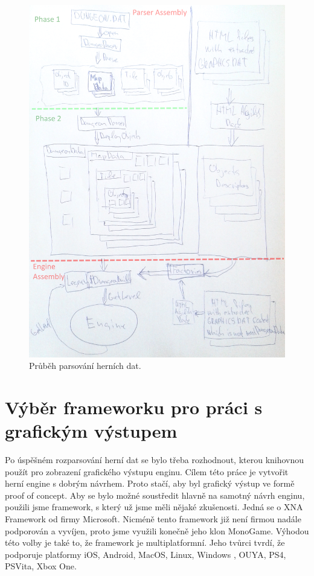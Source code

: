 \begin{figure}[H]\centering
\includegraphics[width=\textwidth]{./img/DM-parser.png}
\caption{Průběh parsování herních dat.}
\label{parser:analyza}
\end{figure}

\section{Výběr frameworku pro práci s grafickým výstupem}

Po úspěšném rozparsování herní dat se bylo třeba rozhodnout, kterou knihovnou použít pro zobrazení grafického výstupu enginu. 
Cílem této práce je vytvořit herní engine s dobrým návrhem. Proto stačí, aby byl grafický výstup ve formě proof of concept. 
Aby se bylo možné soustředit hlavně na samotný návrh enginu, použili jsme framework, s který už jsme měli nějaké zkušenosti.
Jedná se o XNA Framework od firmy Microsoft. Nicméně tento framework již není firmou nadále podporován a vyvíjen, proto jsme využili 
konečně jeho klon MonoGame\cite{MonoGame}. Výhodou této volby je také to, že framework je multiplatformní. Jeho tvůrci tvrdí, že podporuje platformy
iOS, Android, MacOS, Linux, Windows , OUYA, PS4, PSVita, Xbox One.

